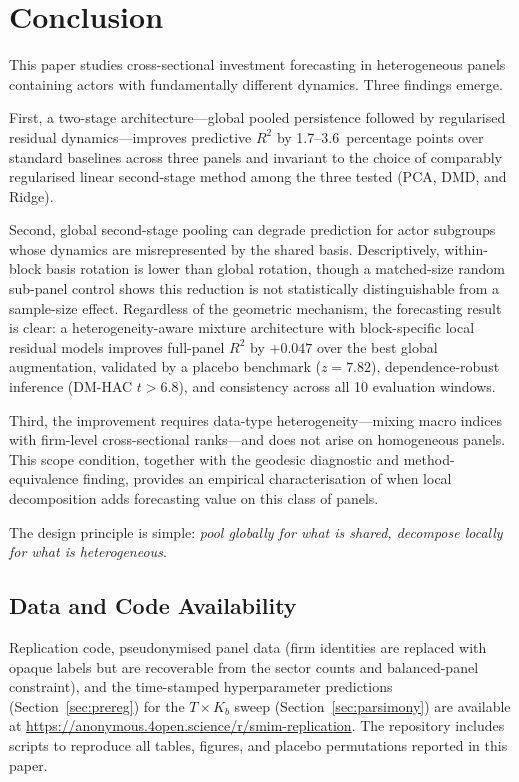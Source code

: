 \documentclass[11pt,a4paper]{article}
\begin{document}
\section{Conclusion}
\label{sec:conclusion}

This paper studies cross-sectional investment forecasting in heterogeneous panels containing actors with fundamentally different dynamics. Three findings emerge.

First, a two-stage architecture---global pooled persistence followed by regularised residual dynamics---improves predictive $R^2$ by 1.7--3.6~percentage points over standard baselines across three panels and invariant to the choice of comparably regularised linear second-stage method among the three tested (PCA, DMD, and Ridge).

Second, global second-stage pooling can degrade prediction for actor subgroups whose dynamics are misrepresented by the shared basis. Descriptively, within-block basis rotation is lower than global rotation, though a matched-size random sub-panel control shows this reduction is not statistically distinguishable from a sample-size effect. Regardless of the geometric mechanism, the forecasting result is clear: a heterogeneity-aware mixture architecture with block-specific local residual models improves full-panel $R^2$ by $+0.047$ over the best global augmentation, validated by a placebo benchmark ($z = 7.82$), dependence-robust inference (DM-HAC $t > 6.8$), and consistency across all 10 evaluation windows.

Third, the improvement requires data-type heterogeneity---mixing macro indices with firm-level cross-sectional ranks---and does not arise on homogeneous panels. This scope condition, together with the geodesic diagnostic and method-equivalence finding, provides an empirical characterisation of when local decomposition adds forecasting value on this class of panels.

The design principle is simple: \emph{pool globally for what is shared, decompose locally for what is heterogeneous}.


\subsection*{Data and Code Availability}

Replication code, pseudonymised panel data (firm identities are replaced with opaque labels but are recoverable from the sector counts and balanced-panel constraint), and the time-stamped hyperparameter predictions (Section~\ref{sec:prereg}) for the $T \times K_b$ sweep (Section~\ref{sec:parsimony}) are available at \url{https://anonymous.4open.science/r/smim-replication}. The repository includes scripts to reproduce all tables, figures, and placebo permutations reported in this paper.
\end{document}
